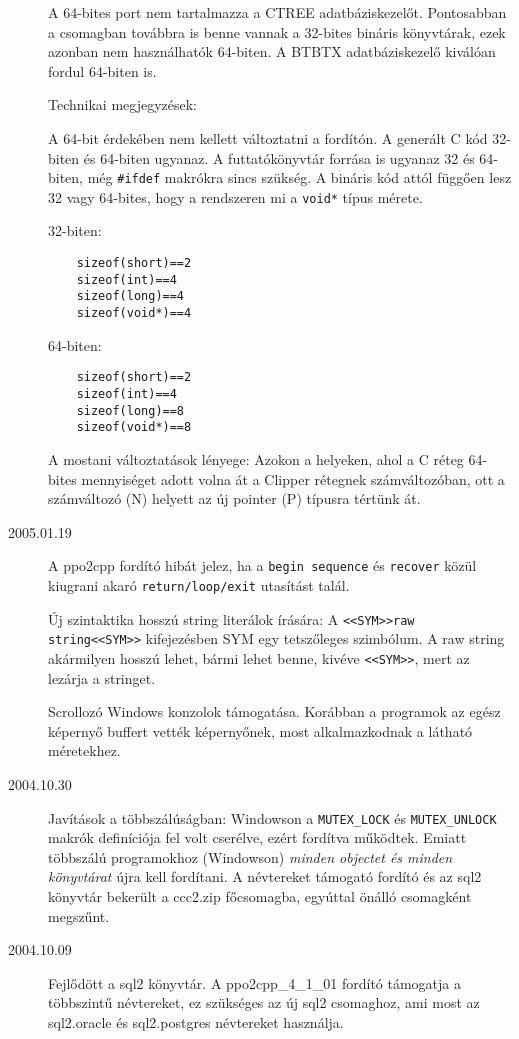 \begin{description}
    A 64-bites port nem tartalmazza a CTREE adatbáziskezelőt. 
    Pontosabban a csomagban továbbra is benne vannak a 32-bites
    bináris könyvtárak, ezek azonban nem használhatók 64-biten.
    A BTBTX adatbáziskezelő kiválóan fordul 64-biten is. 
    
    Technikai megjegyzések: 
    
    A 64-bit érdekében nem kellett változtatni a fordítón. 
    A generált C kód 32-biten és 64-biten ugyanaz. A futtatókönyvtár 
    forrása is ugyanaz 32 és 64-biten, még \verb!#ifdef! makrókra sincs 
    szükség.  A bináris kód attól függően lesz 32 vagy 64-bites, 
    hogy a rendszeren  mi a \verb!void*! típus mérete.
    
    32-biten:
    \begin{verbatim}
    sizeof(short)==2
    sizeof(int)==4
    sizeof(long)==4
    sizeof(void*)==4
    \end{verbatim}

    64-biten:
    \begin{verbatim}
    sizeof(short)==2
    sizeof(int)==4
    sizeof(long)==8
    sizeof(void*)==8
    \end{verbatim}
    
    A mostani változtatások lényege: 
    Azokon a helyeken, ahol a C réteg 64-bites mennyiséget adott
    volna át a Clipper rétegnek számváltozóban, ott a számváltozó (N)
    helyett az új pointer (P) típusra tértünk át.
\item[2005.01.19]
    A ppo2cpp fordító hibát jelez, 
    ha a \verb!begin sequence! és \verb!recover! közül kiugrani
    akaró \verb!return/loop/exit! utasítást talál.
    
    Új szintaktika hosszú string literálok írására: 
    A \verb!<<SYM>>raw string<<SYM>>! kifejezésben SYM egy tetszőleges
    szimbólum. A raw string akármilyen hosszú lehet, bármi
    lehet benne, kivéve \verb!<<SYM>>!, mert az lezárja a stringet.

    Scrollozó Windows konzolok támogatása. Korábban a programok
    az egész képernyő buffert vették képernyőnek, most alkalmazkodnak
    a látható méretekhez.
\item[2004.10.30]
    Javítások a többszálúságban: Windowson a \verb!MUTEX_LOCK! és
    \verb!MUTEX_UNLOCK! makrók definíciója fel volt cserélve, 
    ezért fordítva működtek. Emiatt többszálú programokhoz (Windowson) 
    {\em minden objectet és minden könyvtárat\/} újra kell fordítani.
    A névtereket támogató fordító és az sql2 könyvtár 
    bekerült a ccc2.zip főcsomagba, egyúttal önálló csomagként megszűnt.
\item[2004.10.09]
    Fejlődött a  sql2 könyvtár.
    A ppo2cpp\_4\_1\_01  fordító támogatja a többszintű névtereket, 
    ez szükséges az új sql2 csomaghoz, 
    ami most az sql2.oracle és sql2.postgres névtereket használja.


\end{description}
